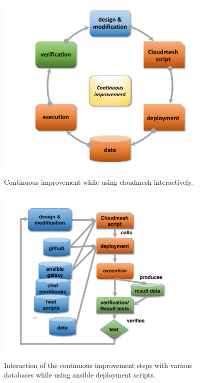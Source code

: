 \begin{figure}[htb]
  \centering
      \includegraphics[width=1.0\columnwidth]{images/nist-devops-1.pdf}
  \caption{Continuous improvement while using cloudmesh interactively.}
  \label{F:NIST-arch}

\bigskip

  \centering
      \includegraphics[width=0.8\columnwidth]{images/nist-devops-2.pdf}
  \caption{Interaction of the continuous improvement steps with
    various databases while using ansible deployment scripts.}
  \label{F:NIST-arch}
\end{figure}




